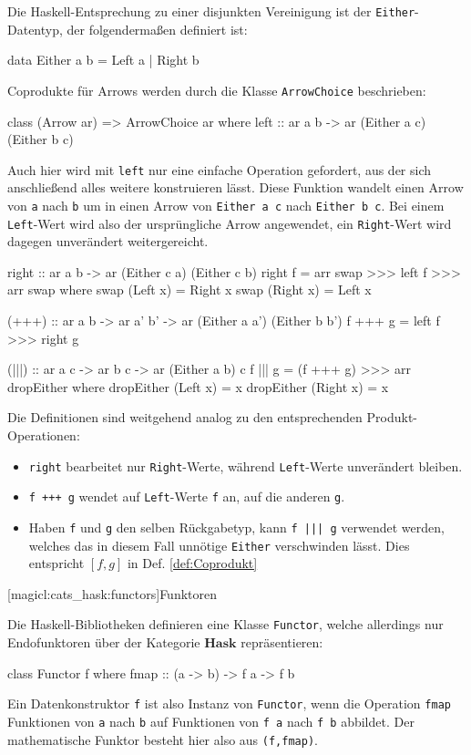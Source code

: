 \documentclass[a4paper, bibgerm]{book}
\newcommand\icode[1]{\lstinline?#1?}
\newcommand\lsubsection{}
\newcommand{\dref}[1]{Def. \ref{def:#1}}
\begin{document}
Die Haskell-Entsprechung zu einer disjunkten Vereinigung ist der
\icode{Either}-Datentyp, der folgendermaßen definiert ist:
\begin{code}
data Either a b = Left a | Right b
\end{code}
Coprodukte für Arrows werden durch die Klasse \icode{ArrowChoice} beschrieben:
\begin{code}
class (Arrow ar) => ArrowChoice ar where
  left :: ar a b -> ar (Either a c) (Either b c)
\end{code}
Auch hier wird mit \icode{left} nur eine einfache Operation gefordert,
aus der sich anschließend alles weitere konstruieren lässt. Diese
Funktion wandelt einen Arrow von \icode{a} nach \icode{b} um in
einen Arrow von \icode{Either a c} nach \icode{Either b c}. Bei einem
\icode{Left}-Wert wird also der ursprüngliche Arrow angewendet, ein
\icode{Right}-Wert wird dagegen unverändert weitergereicht.
\begin{code}
  right :: ar a b -> ar (Either c a) (Either c b)
  right f = arr swap >>> left f >>> arr swap
    where swap (Left x)  = Right x
          swap (Right x) = Left x

  (+++) :: ar a b -> ar a' b' -> ar (Either a a') (Either b b')
  f +++ g = left f >>> right g

  (|||) :: ar a c -> ar b c -> ar (Either a b) c
  f ||| g = (f +++ g) >>> arr dropEither
    where dropEither (Left x)  = x
          dropEither (Right x) = x

\end{code} %
Die Definitionen sind weitgehend analog zu den entsprechenden
Produkt-Operationen:
\begin{itemize}
\item \icode{right} bearbeitet nur \icode{Right}-Werte, während
  \icode{Left}-Werte unverändert bleiben.
\item \icode{f +++ g} wendet auf \icode{Left}-Werte \icode{f} an, auf
  die anderen \icode{g}.
\item Haben \icode{f} und \icode{g} den selben Rückgabetyp, kann
  \icode{f ||| g} verwendet werden, welches das in diesem Fall unnötige
  \icode{Either} verschwinden lässt. Dies entspricht $[f,g]$ in
  \dref{Coprodukt}
\end{itemize}

\lsubsection[magicl:cats_hask:functors]{Funktoren}

Die Haskell-Bibliotheken definieren eine Klasse \icode{Functor}, welche
allerdings nur Endofunktoren über der Kategorie $\mathbf{Hask}$ repräsentieren:
\begin{code}
class Functor f where
  fmap :: (a -> b) -> f a -> f b
\end{code}
Ein Datenkonstruktor \icode{f} ist also Instanz von \icode{Functor},
wenn die Operation \icode{fmap} Funktionen von \icode{a} nach \icode{b}
auf Funktionen von \icode{f a} nach \icode{f b} abbildet. Der
mathematische Funktor besteht hier also aus \icode{(f,fmap)}.
\end{document}
